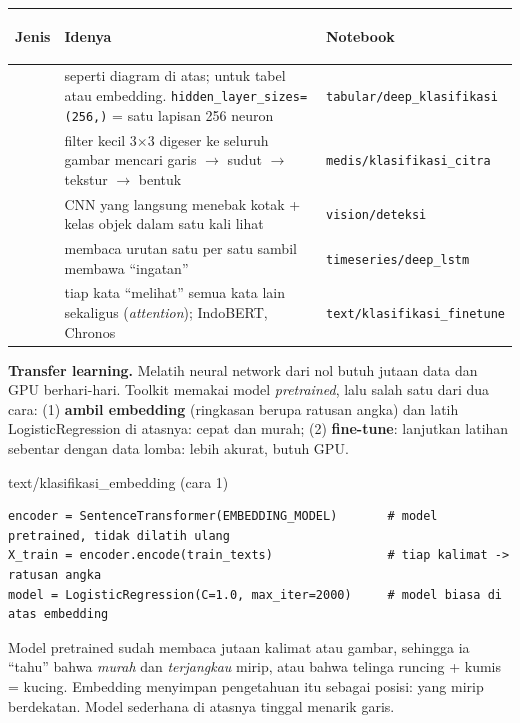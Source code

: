 \documentclass[10pt,a4paper]{article}
\newcommand{\kode}[1]{\texttt{\small #1}}
\begin{document}
{\small
\begin{tabularx}{\linewidth}{@{}>{\bfseries\raggedright\arraybackslash}p{3.2cm}XP{4.2cm}@{}}
\toprule
Jenis & Idenya & Notebook\\ \midrule
{} & seperti diagram di atas; untuk tabel atau embedding. \kode{hidden\_layer\_sizes=(256,)} = satu lapisan 256 neuron
& \kode{tabular/deep\_klasifikasi}\\
 & filter kecil 3$\times$3 digeser ke seluruh gambar mencari garis $\to$ sudut $\to$ tekstur $\to$ bentuk
& \kode{medis/klasifikasi\_citra}\\
 & CNN yang langsung menebak kotak + kelas objek dalam satu kali lihat & \kode{vision/deteksi}\\
 & membaca urutan satu per satu sambil membawa ``ingatan'' & \kode{timeseries/deep\_lstm}\\
 & tiap kata ``melihat'' semua kata lain sekaligus (\emph{attention}); IndoBERT, Chronos
& \kode{text/klasifikasi\_finetune}\\ \bottomrule
\end{tabularx}}

\begin{inti}[hijau1]
\textbf{Transfer learning.} Melatih neural network dari nol butuh jutaan data dan GPU berhari-hari. Toolkit memakai model
\emph{pretrained}, lalu salah satu dari dua cara: (1) \textbf{ambil embedding} (ringkasan berupa ratusan angka) dan latih
LogisticRegression di atasnya: cepat dan murah; (2) \textbf{fine-tune}: lanjutkan latihan sebentar dengan data lomba: lebih akurat,
butuh GPU.
\end{inti}

\begin{soal}{text/klasifikasi\_embedding (cara 1)}
\begin{lstlisting}
encoder = SentenceTransformer(EMBEDDING_MODEL)       # model pretrained, tidak dilatih ulang
X_train = encoder.encode(train_texts)                # tiap kalimat -> ratusan angka
model = LogisticRegression(C=1.0, max_iter=2000)     # model biasa di atas embedding
\end{lstlisting}
\end{soal}

\begin{kenapa}
Model pretrained sudah membaca jutaan kalimat atau gambar, sehingga ia ``tahu'' bahwa \emph{murah} dan \emph{terjangkau}
mirip, atau bahwa telinga runcing + kumis = kucing. Embedding menyimpan pengetahuan itu sebagai posisi: yang mirip
berdekatan. Model sederhana di atasnya tinggal menarik garis.
\end{kenapa}
\end{document}
